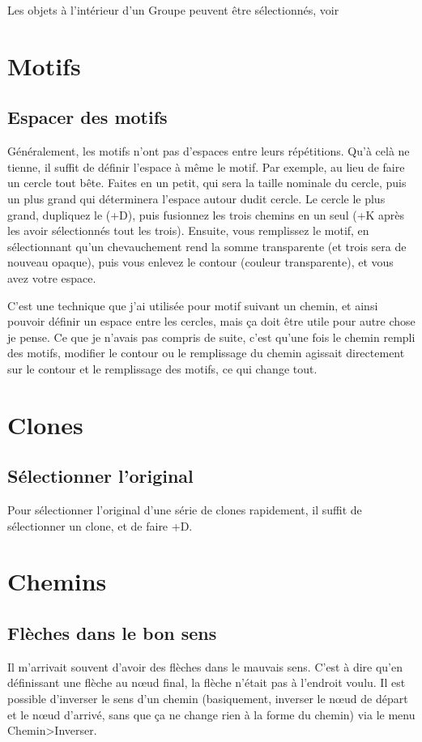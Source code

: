 \documentclass[a4paper,twoside]{article}
\begin{document}
Les objets à l'intérieur d'un Groupe peuvent être sélectionnés, voir 

\section{Motifs}
\subsection{Espacer des motifs}
Généralement, les motifs n'ont pas d'espaces entre leurs répétitions. Qu'à celà ne tienne, il suffit de définir l'espace à même le motif. Par exemple, au lieu de faire un cercle tout bête. Faites en un petit, qui sera la taille nominale du cercle, puis un plus grand qui déterminera l'espace autour dudit cercle. Le cercle le plus grand, dupliquez le (+D), puis fusionnez les trois chemins en un seul (+K après les avoir sélectionnés tout les trois). Ensuite, vous remplissez le motif, en sélectionnant qu'un chevauchement rend la somme transparente (et trois sera de nouveau opaque), puis vous enlevez le contour (couleur transparente), et vous avez votre espace.

\begin{remarque}
C'est une technique que j'ai utilisée pour \og motif suivant un chemin\fg, et ainsi pouvoir définir un espace entre les cercles, mais ça doit être utile pour autre chose je pense. Ce que je n'avais pas compris de suite, c'est qu'une fois le chemin rempli des motifs, modifier le contour ou le remplissage du chemin agissait directement sur le contour et le remplissage des motifs, ce qui change tout.
\end{remarque}

\section{Clones}
\subsection{Sélectionner l'original}
Pour sélectionner l'original d'une série de clones rapidement, il suffit de sélectionner un clone, et de faire +D.

\section{Chemins}
\subsection{Flèches dans le bon sens}
Il m'arrivait souvent d'avoir des flèches dans le mauvais sens. C'est à dire qu'en définissant une flèche au n\oe ud final, la flèche n'était pas à l'endroit voulu. Il est possible d'inverser le sens d'un chemin (basiquement, inverser le n\oe ud de départ et le n\oe ud d'arrivé, sans que ça ne change rien à la forme du chemin) via le menu Chemin>Inverser.
\end{document}
